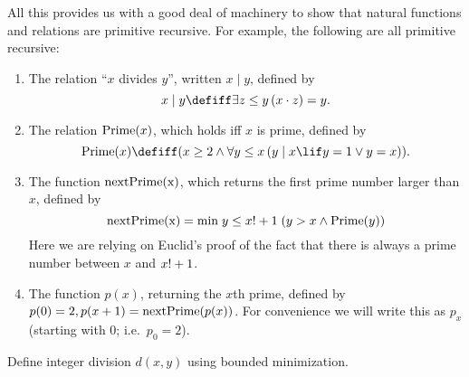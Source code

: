 \documentclass[../../include/open-logic-section]{subfiles}
\begin{document}
All this provides us with a good deal of machinery to show that
natural functions and relations are primitive recursive. For example,
the following are all primitive recursive:
\begin{enumerate}
\item The relation ``$x$ divides $y$'', written $x \mid y$, defined by
\[
x \mid y \defiff \lexists[z \leq y][(x \cdot z) = y].
\]

\item The relation $\mathrm{Prime}(x)$, which holds iff $x$ is prime,
  defined by
\[
\fn{Prime}(x) \defiff (x \geq 2 \land \lforall[y \leq x][(y \mid x \lif y
  = 1 \lor y = x))].
\]
\item The function $\mathrm{nextPrime(x)}$, which returns the first prime
  number larger than $x$, defined by
\[
  \mathrm{nextPrime(x)} =
  \mathrm{min} \; y \leq x\text{!}+1 \; (y > x \land \mathrm{Prime}(y))
\]
Here we are relying on Euclid's proof of the fact that there is always
a prime number between $x$ and $x\text{!}+1$.

\item The function $p(x)$, returning the $x$th prime, defined by $p(0)
  = 2, p(x+1) = \mathrm{nextPrime}(p(x))$. For convenience we will write
  this as $p_x$ (starting with 0; i.e.\ $p_0=2$).
\end{enumerate}

\begin{prob}
Define integer division $d(x, y)$ using bounded minimization.
\end{prob}
\end{document}
